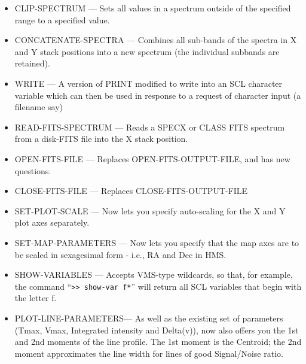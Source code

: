 \documentclass[twoside,11pt,nolof]{starlink}
\begin{document}
\begin{itemize}
\item CLIP-SPECTRUM       --- Sets all values in a spectrum outside of the specified
                        range to a specified value.

\item CONCATENATE-SPECTRA --- Combines all sub-bands of the spectra in X and Y stack
                        positions into a new spectrum (the individual subbands
                        are retained).

\item WRITE               --- A version of PRINT modified to write into an SCL
                        character variable which can then be used in response
                        to a request of character input (a filename say)

\item READ-FITS-SPECTRUM  --- Reads a SPECX or CLASS FITS spectrum from a disk-FITS
                        file into the X stack position.

\item OPEN-FITS-FILE      --- Replaces OPEN-FITS-OUTPUT-FILE, and has new questions.

\item CLOSE-FITS-FILE     --- Replaces CLOSE-FITS-OUTPUT-FILE

\item SET-PLOT-SCALE      --- Now lets you specify auto-scaling for the X and Y
                        plot axes separately.

\item SET-MAP-PARAMETERS  --- Now lets you specify that the map axes are to be
                        scaled in sexagesimal form - i.e., RA and Dec in HMS.

\item SHOW-VARIABLES      --- Accepts VMS-type wildcards, so that, for example, the
                        command ``\verb+>> show-var f*+'' will return all SCL variables
                        that begin with the letter f.

\item PLOT-LINE-PARAMETERS--- As well as the existing set of parameters (Tmax, Vmax,
                        Integrated intensity and Delta(v)), now also offers you
                        the 1st and 2nd moments of the line profile. The 1st
                        moment is the Centroid; the 2nd moment approximates the
                        line width for lines of good Signal/Noise ratio.
\end{itemize}
\end{document}
